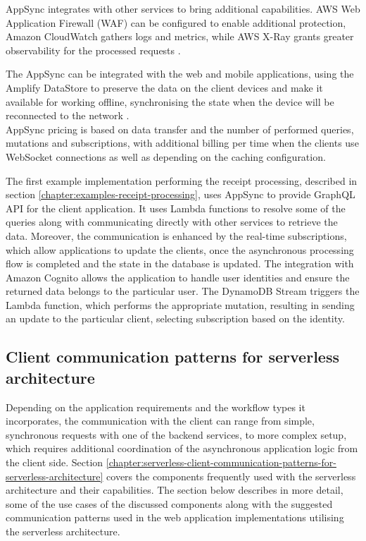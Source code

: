 AppSync integrates with other services to bring additional capabilities.
AWS Web Application Firewall (WAF) can be configured to enable additional protection, Amazon CloudWatch gathers logs and metrics, while AWS X-Ray grants greater observability for the processed requests \cite{DevelopServerlessGraphQLArchitecturesUsingAWSAppSync}.

The AppSync can be integrated with the web and mobile applications, using the Amplify DataStore to preserve the data on the client devices and make it available for working offline, synchronising the state when the device will be reconnected to the network \cite{AppSyncFeatures}. \\

AppSync pricing is based on data transfer and the number of performed queries, mutations and subscriptions, with additional billing per time when the clients use WebSocket connections as well as depending on the caching configuration.

The first example implementation performing the receipt processing, described in section \ref{chapter:examples-receipt-processing}, uses AppSync to provide GraphQL API for the client application. It uses Lambda functions to resolve some of the queries along with communicating directly with other services to retrieve the data.
Moreover, the communication is enhanced by the real-time subscriptions, which allow applications to update the clients, once the asynchronous processing flow is completed and the state in the database is updated.
The integration with Amazon Cognito allows the application to handle user identities and ensure the returned data belongs to the particular user.
The DynamoDB Stream triggers the Lambda function, which performs the appropriate mutation, resulting in sending an update to the particular client, selecting subscription based on the identity.

\subsection{Client communication patterns for serverless architecture} \label{chapter:client-communication-patterns-for-serverless-architecture}

Depending on the application requirements and the workflow types it incorporates, the communication with the client can range from simple, synchronous requests with one of the backend services, to more complex setup, which requires additional coordination of the asynchronous application logic from the client side.
Section \ref{chapter:serverless-client-communication-patterns-for-serverless-architecture} covers the components frequently used with the serverless architecture and their capabilities.
The section below describes in more detail, some of the use cases of the discussed components along with the suggested communication patterns used in the web application implementations utilising the serverless architecture.


